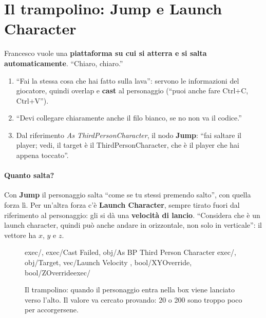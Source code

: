 \section{Il trampolino: Jump e Launch Character}
\label{gd12:sec:trampolino}

Francesco vuole una \textbf{piattaforma su cui si atterra e si salta
automaticamente}. ``Chiaro, chiaro.''
\begin{enumerate}
  \item ``Fai la stessa cosa che hai fatto sulla lava'': servono le
        informazioni del giocatore, quindi overlap e \textbf{cast} al
        personaggio (``puoi anche fare Ctrl+C, Ctrl+V'').
  \item ``Devi collegare chiaramente anche il filo bianco, se no non va il
        codice.''
  \item Dal riferimento \emph{As ThirdPersonCharacter}, il nodo
        \textbf{Jump}: ``fai saltare il player; vedi, il target è il
        ThirdPersonCharacter, che è il player che hai appena toccato''.
\end{enumerate}

\paragraph{Quanto salta?} Con \textbf{Jump} il personaggio salta ``come se tu
stessi premendo salto'', con quella forza lì. Per un'altra forza c'è
\textbf{Launch Character}, sempre tirato fuori dal riferimento al personaggio:
gli si dà una \textbf{velocità di lancio}. ``Considera che è un launch character,
quindi può anche andare in orizzontale, non solo in verticale'': il vettore ha
$x$, $y$ e $z$.

\begin{figure}[htbp]
\centering
\begin{bpgraph}
    {exec/, exec/Cast Failed, obj/As BP Third Person Character}
    {exec/, obj/Target, vec/Launch Velocity , bool/XYOverride, bool/ZOverride}{exec/}
\end{bpgraph}
\caption{Il trampolino: quando il personaggio entra nella box viene lanciato
verso l'alto. Il valore va cercato provando: 20 o 200 sono troppo poco per
accorgersene.}
\label{gd12:fig:trampolino}
\end{figure}

